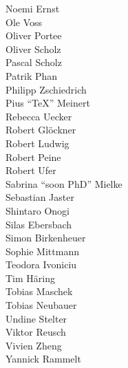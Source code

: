 \begin{minipage}[t][\textheight][b]{.25\textwidth}
Noemi Ernst\\
Ole Voss\\
Oliver Portee\\
Oliver Scholz\\
Pascal Scholz\\
Patrik Phan\\
Philipp Zschiedrich\\
Pius \foreignlanguage{english}{\enquote{\TeX}} Meinert\\
Rebecca Uecker\\
Robert Glöckner\\
Robert Ludwig\\
Robert Peine\\
Robert Ufer\\
Sabrina \foreignlanguage{english}{\enquote{soon PhD}} Mielke\\
Sebastian Jaster\\
Shintaro Onogi\\
Silas Ebersbach\\
Simon Birkenheuer\\
Sophie Mittmann\\
Teodora Ivoniciu\\
Tim Häring\\
Tobias Maschek\\
Tobias Neubauer\\
Undine Stelter\\
Viktor Reusch\\
Vivien Zheng\\
Yannick Rammelt
\end{minipage}

\enlargethispage{2\baselineskip}

